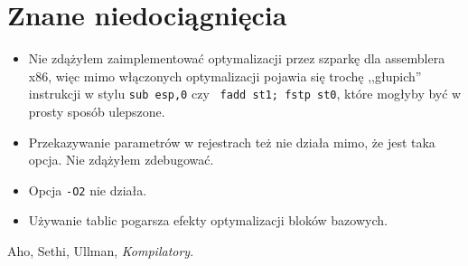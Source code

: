 \documentclass[a4paper,12pt]{article}
\begin{document}
\section{Znane niedociągnięcia}

\begin{itemize}
 \item Nie zdążyłem zaimplementować optymalizacji przez szparkę dla
       assemblera x86, więc mimo włączonych optymalizacji pojawia się
       trochę ,,głupich'' instrukcji w stylu {\tt sub esp,0} czy {\tt
       fadd st1; fstp st0}, które mogłyby być w prosty sposób ulepszone.
 \item Przekazywanie parametrów w rejestrach też nie działa mimo, że
       jest taka opcja. Nie zdążyłem zdebugować.
 \item Opcja {\tt -O2} nie działa.
 \item Używanie tablic pogarsza efekty optymalizacji bloków bazowych.
\end{itemize}

\begin{thebibliography}{00}
  Aho, Sethi, Ullman, {\it Kompilatory}.
\end{thebibliography}
\end{document}
